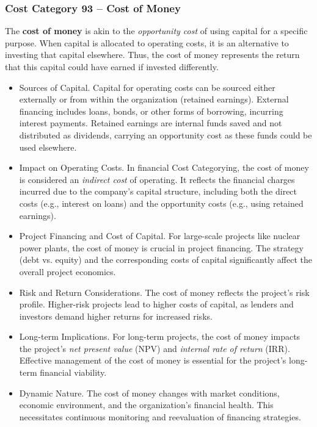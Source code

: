 \subsubsection*{Cost Category 93 – Cost of Money}
The \textbf{cost of money} is akin to the \textit{opportunity cost} of using capital for a specific purpose. When capital is allocated to operating costs, it is an alternative to investing that capital elsewhere. Thus, the cost of money represents the return that this capital could have earned if invested differently.
\begin{itemize}
    \item Sources of Capital. Capital for operating costs can be sourced either externally or from within the organization (retained earnings). External financing includes loans, bonds, or other forms of borrowing, incurring interest payments. Retained earnings are internal funds saved and not distributed as dividends, carrying an opportunity cost as these funds could be used elsewhere.
    \item Impact on Operating Costs. In financial Cost Categorying, the cost of money is considered an \textit{indirect cost} of operating. It reflects the financial charges incurred due to the company's capital structure, including both the direct costs (e.g., interest on loans) and the opportunity costs (e.g., using retained earnings).
    \item Project Financing and Cost of Capital.  For large-scale projects like nuclear power plants, the cost of money is crucial in project financing. The strategy (debt vs. equity) and the corresponding costs of capital significantly affect the overall project economics.
    \item Risk and Return Considerations. The cost of money reflects the project's risk profile. Higher-risk projects lead to higher costs of capital, as lenders and investors demand higher returns for increased risks.
    \item Long-term Implications.  For long-term projects, the cost of money impacts the project's \textit{net present value} (NPV) and \textit{internal rate of return} (IRR). Effective management of the cost of money is essential for the project's long-term financial viability.
    \item Dynamic Nature.  The cost of money changes with market conditions, economic environment, and the organization's financial health. This necessitates continuous monitoring and reevaluation of financing strategies.
\end{itemize}

